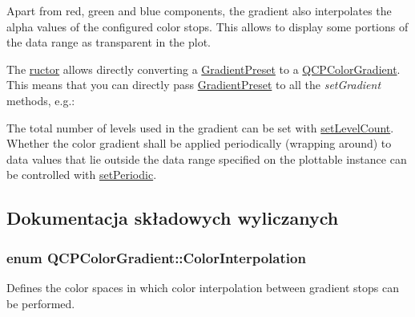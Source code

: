 Apart from red, green and blue components, the gradient also interpolates the alpha values of the configured color stops. This allows to display some portions of the data range as transparent in the plot.



The \hyperlink{class_q_c_p_color_gradient}{ructor} allows directly converting a \hyperlink{class_q_c_p_color_gradient_aed6569828fee337023670272910c9072}{Gradient\+Preset} to a \hyperlink{class_q_c_p_color_gradient}{Q\+C\+P\+Color\+Gradient}. This means that you can directly pass \hyperlink{class_q_c_p_color_gradient_aed6569828fee337023670272910c9072}{Gradient\+Preset} to all the {\itshape set\+Gradient} methods, e.\+g.\+: 
\begin{DoxyCodeInclude}
\end{DoxyCodeInclude}
 The total number of levels used in the gradient can be set with \hyperlink{class_q_c_p_color_gradient_a18da587eb4f7fc788ea28ba15b6a12de}{set\+Level\+Count}. Whether the color gradient shall be applied periodically (wrapping around) to data values that lie outside the data range specified on the plottable instance can be controlled with \hyperlink{class_q_c_p_color_gradient_a39d6448155fc00a219f239220d14bb39}{set\+Periodic}. 

\subsection{Dokumentacja składowych wyliczanych}
\subsubsection[{\texorpdfstring{Color\+Interpolation}{ColorInterpolation}}]{\setlength{\rightskip}{0pt plus 5cm}enum {\bf Q\+C\+P\+Color\+Gradient\+::\+Color\+Interpolation}}\hypertarget{class_q_c_p_color_gradient_ac5dca17cc24336e6ca176610e7f77fc1}{}\label{class_q_c_p_color_gradient_ac5dca17cc24336e6ca176610e7f77fc1}
Defines the color spaces in which color interpolation between gradient stops can be performed.

